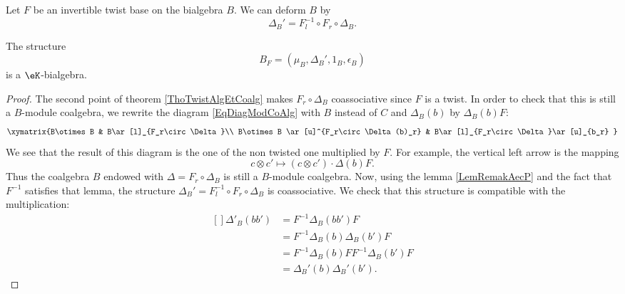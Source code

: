 Let $F$ be an invertible twist base on the bialgebra $B$. We can deform $B$ by
\begin{equation}
	 \Delta_B'=F^{-1}_l\circ F_r\circ\Delta_B.
\end{equation}

\begin{theorem}
	The structure
	\begin{equation}
		B_F=(\mu_B,\Delta_B',1_B,\epsilon_B)
	\end{equation}
	is a $\eK$-bialgebra.
\end{theorem}

\begin{proof}
	The second point of theorem \ref{ThoTwistAlgEtCoalg} makes $F_r\circ\Delta_B$ coassociative since $F$ is a twist. In order to check that this is still a $B$-module coalgebra, we rewrite the diagram \eqref{EqDiagModCoAlg} with $B$ instead of $C$ and $\Delta_B(b)$ by $\Delta_B(b)F$:
\begin{equation}	
	\xymatrix{%
	B\otimes B 		&	B\ar[l]_{F_r\circ\Delta}\\
	B\otimes B \ar[u]^{F_r\circ\Delta(b)_r}	&	B\ar[l]_{F_r\circ\Delta}\ar[u]_{b_r}
	   }
\end{equation}
	We see that the result of this diagram is the one of the non twisted one multiplied by $F$. For example, the vertical left arrow is the mapping
	\begin{equation}
		c\otimes c'\mapsto(c\otimes c')\cdot\Delta(b)F.
	\end{equation}
	Thus the coalgebra $B$ endowed with $\Delta=F_r\circ\Delta_B$ is still a $B$-module coalgebra. Now, using the lemma \ref{LemRemakAecP} and the fact that $F^{-1}$ satisfies that lemma, the structure $\Delta_{B}'=F_l^{-1}\circ F_r\circ\Delta_B$ is coassociative. We check that this structure is compatible with the multiplication:
	\begin{equation}
		\begin{aligned}[]
			\Delta'_B(bb')&=F^{-1}\Delta_B(bb')F\\
					&=F^{-1}\Delta_B(b)\Delta_B(b')F\\
					&=F^{-1}\Delta_B(b)FF^{-1}\Delta_B(b')F\\
					&=\Delta_B'(b)\Delta_B'(b').
		\end{aligned}
	\end{equation}
\end{proof}

